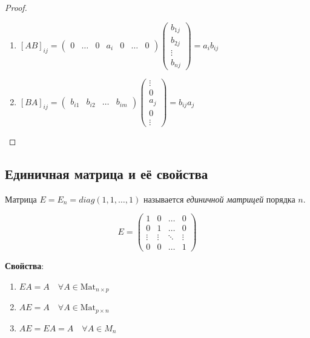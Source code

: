 \begin{proof}
    \begin{enumerate}
    \item $[AB]_{ij} = \begin{pmatrix} 0 & \dots & 0 & a_i & 0 & \dots & 0\end{pmatrix} \begin{pmatrix} b_{1j} \\ b_{2j} \\ \vdots \\ b_{nj} \end{pmatrix} = a_i b_{ij} $
    \item $[BA]_{ij} = \begin{pmatrix} b_{i1} & b_{i2} & \dots & b_{im} \end{pmatrix} \begin{pmatrix} \vdots \\ 0 \\ a_j \\ 0 \\ \vdots \end{pmatrix} = b_{ij} a_j$ 
    \end{enumerate}
\end{proof}

\subsection{Единичная матрица и её свойства}
\begin{definition}
    Матрица $E = E_n = diag(1, 1, \dots, 1)$ называется \textit{единичной матрицей} порядка $n$. 

    \begin{equation*}
        E = \begin{pmatrix} 
            1 & 0 & \dots & 0 \\
            0 & 1 & \dots & 0 \\
            \vdots & \vdots & \ddots & \vdots \\
            0 & 0 & \dots & 1
        \end{pmatrix} 
    \end{equation*}
\end{definition}

\textbf{Свойства}:
\begin{enumerate}
    \item $EA = A \quad \forall A \in \text{Mat}_{n \times p}$
    \item $AE = A \quad \forall A \in \text{Mat}_{p \times n}$
    \item $AE = EA = A \quad \forall A \in M_n$
\end{enumerate}

